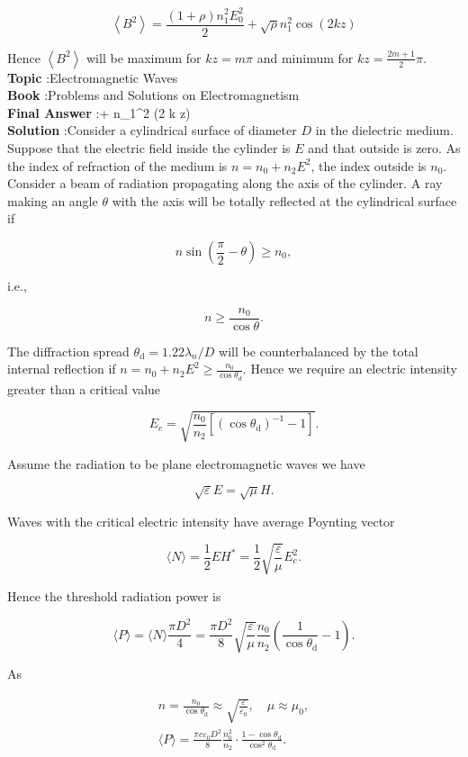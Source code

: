\documentclass[10pt]{article}
\begin{document}
$$
\left\langle B^{2}\right\rangle=\frac{(1+\rho) n_{1}^{2} E_{0}^{2}}{2}+\sqrt{\rho} n_{1}^{2} \cos (2 k z)
$$

Hence $\left\langle B^{2}\right\rangle$ will be maximum for $k z=m \pi$ and minimum for $k z=\frac{2 m+1}{2} \pi$.
\textbf{Topic} :Electromagnetic Waves\\
\textbf{Book} :Problems and Solutions on Electromagnetism\\
\textbf{Final Answer} :+\sqrt{\rho} n_{1}^{2} \cos (2 k z)\\


\textbf{Solution} :Consider a cylindrical surface of diameter $D$ in the dielectric medium. Suppose that the electric field inside the cylinder is $E$ and that outside is zero. As the index of refraction of the medium is $n=n_{0}+n_{2} E^{2}$, the index outside is $n_{0}$. Consider a beam of radiation propagating along the axis of the cylinder. A ray making an angle $\theta$ with the axis will be totally reflected at the cylindrical surface if

$$
n \sin \left(\frac{\pi}{2}-\theta\right) \geq n_{0},
$$

i.e.,

$$
n \geq \frac{n_{0}}{\cos \theta} .
$$

The diffraction spread $\theta_{\mathrm{d}}=1.22 \lambda_{n} / D$ will be counterbalanced by the total internal reflection if $n=n_{0}+n_{2} E^{2} \geq \frac{n_{0}}{\cos \theta_{d}}$. Hence we require an electric intensity greater than a critical value

$$
E_{c}=\sqrt{\frac{n_{0}}{n_{2}}\left[\left(\cos \theta_{\mathrm{d}}\right)^{-1}-1\right]} .
$$

Assume the radiation to be plane electromagnetic waves we have

$$
\sqrt{\varepsilon} E=\sqrt{\mu} H .
$$

Waves with the critical electric intensity have average Poynting vector

$$
\langle N\rangle=\frac{1}{2} E H^{*}=\frac{1}{2} \sqrt{\frac{\varepsilon}{\mu}} E_{c}^{2} .
$$

Hence the threshold radiation power is

$$
\langle P\rangle=\langle N\rangle \frac{\pi D^{2}}{4}=\frac{\pi D^{2}}{8} \sqrt{\frac{\varepsilon}{\mu}} \frac{n_{0}}{n_{2}}\left(\frac{1}{\cos \theta_{\mathrm{d}}}-1\right) .
$$

As

$$
\begin{gathered}
n=\frac{n_{0}}{\cos \theta_{\mathrm{d}}} \approx \sqrt{\frac{\varepsilon}{\varepsilon_{0}}}, \quad \mu \approx \mu_{0}, \\
\langle P\rangle=\frac{\pi c \varepsilon_{0} D^{2}}{8} \frac{n_{0}^{2}}{n_{2}} \cdot \frac{1-\cos \theta_{\mathrm{d}}}{\cos ^{2} \theta_{\mathrm{d}}} .
\end{gathered}
$$
\end{document}
